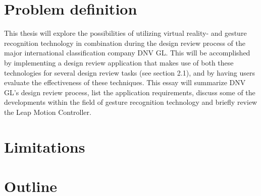 \section{Problem definition}
This thesis will explore the possibilities of utilizing virtual reality- and gesture recognition technology in combination 
during the design review process of the major international classification company DNV GL. 
This will be accomplished by implementing a design review application that makes use of both these technologies for several design review tasks (see section 2.1), 
and by having users evaluate the effectiveness of these techniques. 
This essay will summarize DNV GL's design review process, list the application requirements, 
discuss some of the developments within the field of gesture recognition technology and briefly review the Leap Motion Controller.

\section{Limitations}

\section{Outline}